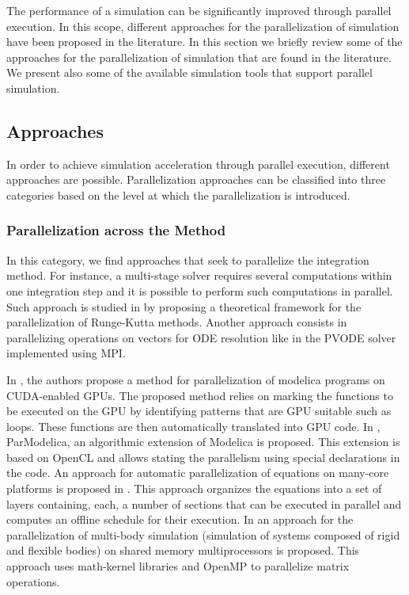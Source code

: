 The performance of a simulation can be significantly improved through parallel execution. In this scope, different approaches for the parallelization of simulation have been proposed in the literature. In this section we briefly review some of the approaches for the parallelization of simulation that are found in the literature. We present also some of the available simulation tools that support parallel simulation.

\subsection{\label{subsec:parsimaprr}Approaches}

In order to achieve simulation acceleration through parallel execution, different approaches are possible. Parallelization approaches can be classified into three categories based on the level at which the parallelization is introduced.

\subsubsection{Parallelization across the Method}
In this category, we find approaches that seek to parallelize the integration method. For instance, a multi-stage solver requires several computations within one integration step and it is possible to perform such computations in parallel. Such approach is studied in \cite{iserles:1990} by proposing a theoretical framework for the parallelization of Runge-Kutta methods. Another approach consists in parallelizing operations on vectors for ODE resolution like in the PVODE solver \cite{byrne:1999} implemented using MPI. 

In \cite{elmqvist:2015}, the authors propose a method for parallelization of modelica programs on CUDA-enabled GPUs. The proposed method relies on marking the functions to be executed on the GPU by identifying patterns that are GPU suitable such as loops. These functions are then automatically translated into GPU code. In \cite{gebremedhin:2012}, ParModelica, an algorithmic extension of Modelica is proposed. This extension is based on OpenCL and allows stating the parallelism using special declarations in the code. An approach for automatic parallelization of equations on many-core platforms is proposed in \cite{elmqvist:2014}. This approach organizes the equations into a set of layers containing, each, a number of sections that can be executed in parallel and computes an offline schedule for their execution. In \cite{clauberg:2012} an approach for the parallelization of multi-body simulation (simulation of systems composed of rigid and flexible bodies) on shared memory multiprocessors is proposed. This approach uses math-kernel libraries and OpenMP to parallelize matrix operations.

